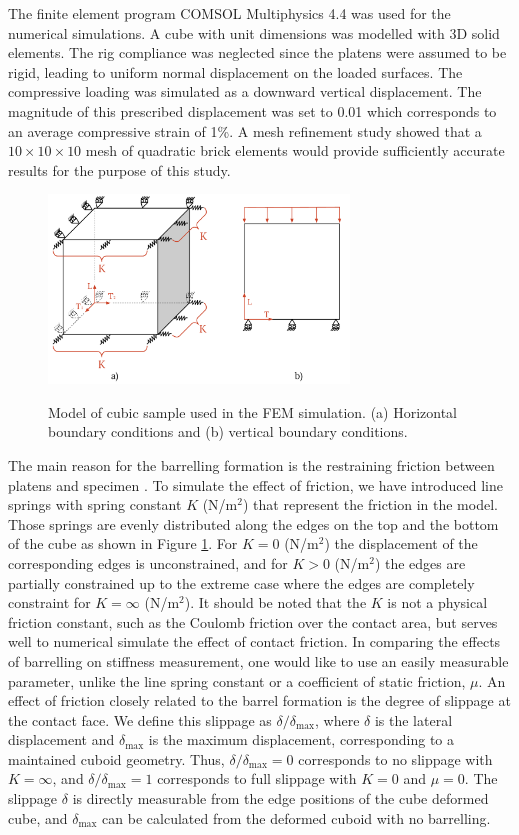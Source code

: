 \documentclass[3p]{elsarticle}
\begin{document}
The finite element program COMSOL Multiphysics 4.4 \cite{Comsol} was used for
the numerical simulations.
A cube with unit dimensions was modelled with
3D solid elements.
The rig compliance was neglected since the platens were assumed to be rigid, leading to uniform normal displacement on the loaded surfaces.
The compressive loading was simulated as a downward vertical
displacement. The magnitude of this prescribed displacement was set to 0.01
which corresponds to an average compressive strain of  1\%.
A mesh refinement study showed that a $10\times10\times10$ mesh of quadratic
brick elements would provide sufficiently accurate results for the
purpose of this study.

\begin{figure}[h]
\centering
\includegraphics[width=8cm]{BarellingPaper.pdf}
\label{fig:Barrelling}
\caption{\label{fig:Barrelling} Model of cubic
sample used in the FEM simulation. 
(a) Horizontal boundary conditions and (b) vertical boundary conditions.}
\end{figure}

The main reason for the barrelling formation is the restraining friction between platens
and specimen \cite{Narayanasamy198821, kulkarni1969}. To simulate the effect of
friction, we have introduced line springs with spring constant $K$ (N/m$^2$) that represent the friction 
in the model. Those springs are evenly distributed along the edges on the top and the bottom of the cube as shown in Figure \ref{fig:Barrelling}.  
For $K=0$ (N/m$^2$) the displacement of the corresponding
edges is unconstrained, and for $K>0$ (N/m$^2$) the edges are partially
constrained up to the extreme case where the edges are completely constraint for
$K=\infty$ (N/m$^2$). It should be noted that the $K$ is not a physical friction
constant, such as the Coulomb friction over the contact area, but serves well to numerical simulate the effect of contact friction. 
In comparing the effects of barrelling on stiffness measurement, one would like
to use an easily measurable parameter, unlike the line spring constant or a
coefficient of static friction, $\mu$. An effect of friction closely related to
the barrel formation is the degree of slippage at the contact face. We define
this slippage as $\delta/\delta_{\mathrm{max}}$, where $\delta$ is the lateral
displacement and $\delta_{\mathrm{max}}$ is the maximum displacement,
corresponding to a maintained cuboid geometry.
Thus, $\delta/\delta_{\mathrm{max}}=0$ corresponds to no slippage with
$K=\infty$, and $\delta/\delta_{\mathrm{max}}=1$ corresponds to full slippage
with $K=0$ and $\mu=0$. The slippage $\delta$ is directly measurable from the
edge positions of the cube deformed cube, and $\delta_{\mathrm{max}}$ can be
calculated  from the deformed cuboid with no barrelling.
\end{document}
